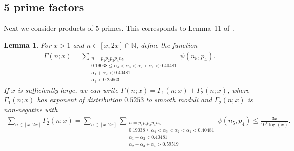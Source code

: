 \documentclass{amsart}
\newtheorem{lemma}{Lemma}
\numberwithin{equation}{section}
\begin{document}
\subsection{5 prime factors}

Next we consider  products of $5$ primes. This corresponds to Lemma~11 of~\cite{Baker:2017:BIP}. 

\begin{lemma} \label{lem:5primes}
For $x>1$ and  $n \in [x,2x]\cap \mathbb{N}$, define the function 
\begin{align*}
\Gamma(n;x)=\sum_{\substack{ n = p_1p_2p_3p_4n_5 \\ 0.19038 \leq \alpha_4 < \alpha_3 < \alpha_2 < \alpha_1 < 0.40481 \\ \alpha_1+\alpha_2 < 0.40481 \\ \alpha_3 < 0.25663}}  \psi(n_5, p_4). 
\end{align*}
If $x$ is sufficiently large, we can write $\Gamma(n;x) = \Gamma_1(n;x) + \Gamma_2(n;x)$, where $\Gamma_1(n;x)$ has exponent of distribution $0.5253$ to smooth moduli and $\Gamma_2(n;x)$ is non-negative with 
\begin{align*}
\sum_{n \in [x,2x]} \Gamma_2(n;x) = \sum_{n \in [x,2x]} \sum_{\substack{ n = p_1p_2p_3p_4n_5 \\ 0.19038\leq \alpha_4 < \alpha_3 < \alpha_2 < \alpha_1 < 0.40481 \\ \alpha_1+\alpha_2 < 0.40481 \\ \alpha_2+\alpha_3 +\alpha_4 > 0.59519}}  \psi(n_5, p_4)\leq \frac{3x}{10^7\log(x)}.
\end{align*}
\end{lemma}
\end{document}
